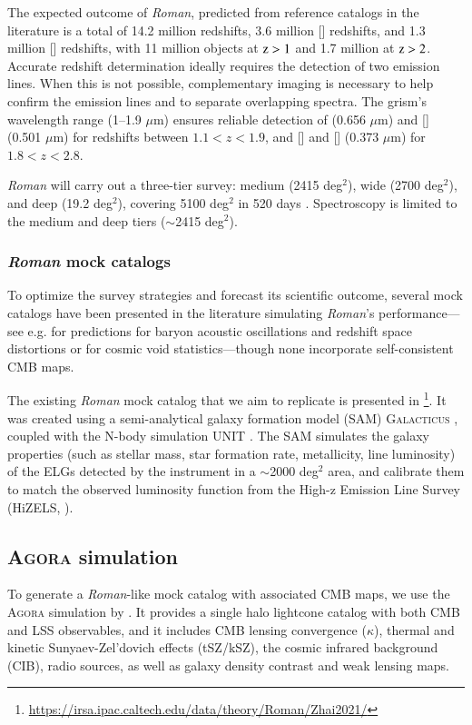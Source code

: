\documentclass[]{aa} %
\begin{document}
The expected outcome of \emph{Roman}, predicted from reference catalogs in the literature is a total of 14.2 million  redshifts, 3.6 million [] redshifts, and 1.3 million [] redshifts, with 11 million objects at $\rm z>1$ and 1.7 million at $\rm z>2$. Accurate redshift determination ideally requires the detection of two emission lines. When this is not possible, complementary imaging is necessary to help confirm the emission lines and to separate overlapping spectra. The grism’s wavelength range (1–1.9 $\mu$m) ensures reliable detection of  (0.656 $\mu$m) and [] (0.501 $\mu$m) for redshifts between $1.1 < z < 1.9$, and [] and [] (0.373 $\mu$m) for $1.8 < z < 2.8$. 

\emph{Roman} will carry out a three-tier survey: medium (2415 deg$^2$), wide (2700 deg$^2$), and deep (19.2 deg$^2$), covering 5100 deg$^2$ in 520 days \citep{zasowski2025roman}. Spectroscopy is limited to the medium and deep tiers ($\sim$2415 deg$^2$).


\subsubsection{\emph{Roman} mock catalogs}
To optimize the survey strategies and forecast its scientific outcome, several mock catalogs have been presented in the literature simulating \emph{Roman}'s performance---see e.g. \citet{wang2022} for predictions for baryon acoustic oscillations and redshift space distortions or \citet{verza2024cosmology} for cosmic void statistics---though none incorporate self-consistent CMB maps.

The existing \emph{Roman} mock catalog that we aim to replicate is presented in \cite{zhai2021clustering}\footnote{\url{https://irsa.ipac.caltech.edu/data/theory/Roman/Zhai2021/}}. It was created using a semi-analytical galaxy formation model (SAM) \textsc{Galacticus} \citep{benson2012galacticus}, coupled with the N-body simulation UNIT \citep[][see Table~\ref{tab:comparison_sims} for specifications]{chuang2019unit}. The SAM simulates the galaxy properties (such as stellar mass, star formation rate, metallicity, line luminosity) of the ELGs detected by the instrument in a $\sim$2000 deg$^2$ area, and calibrate them to match the observed  luminosity function from the High-z Emission Line Survey (HiZELS, \citealt{geach2008hizels,sobral2009hizels,sobral2013large}). 

\subsection{\textsc{Agora} simulation}
To generate a \emph{Roman}-like mock catalog with associated CMB maps, we use the \textsc{Agora} simulation by \cite{omori2022}. It provides a single halo lightcone catalog with both CMB and LSS observables, and it includes CMB lensing convergence ($\kappa$), thermal and kinetic Sunyaev-Zel'dovich effects (tSZ/kSZ), the cosmic infrared background (CIB), radio sources, as well as galaxy density contrast and weak lensing maps.
\end{document}
